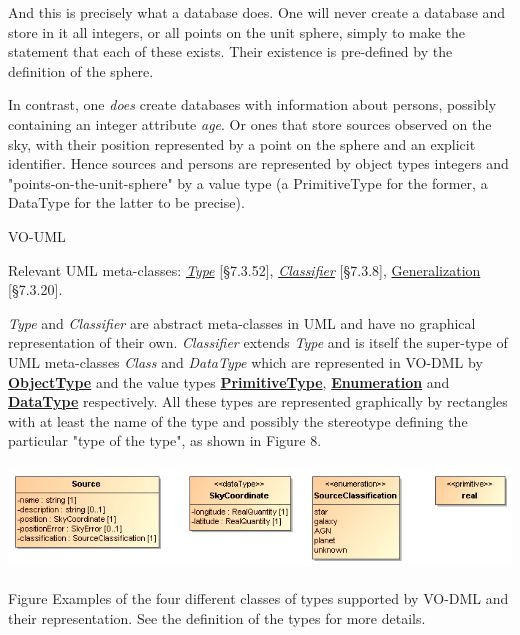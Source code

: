 \documentclass[10pt,a4paper]{ivoa}
\begin{document}
And this is precisely what a database does. One will never create a
database and store in it all integers, or all points on the unit sphere,
simply to make the statement that each of these exists. Their existence
is pre-defined by the definition of the sphere.

In contrast, one \emph{does} create databases with information about
persons, possibly containing an integer attribute \emph{age}. Or ones
that store sources observed on the sky, with their position represented
by a point on the sphere and an explicit identifier. Hence sources and
persons are represented by object types integers and
"points-on-the-unit-sphere" by a value type (a PrimitiveType for the
former, a DataType for the latter to be precise).

\protect\hypertarget{_extends:_ElementRef}{}{}

VO-UML

Relevant UML meta-classes:
\href{http://www.uml-diagrams.org/uml-core.html\#type}{\emph{Type}}
{[}§7.3.52{]},
\href{http://www.uml-diagrams.org/classifier.html}{\emph{Classifier}}
{[}§7.3.8{]},
\href{http://www.uml-diagrams.org/generalization.html}{Generalization}
{[}§7.3.20{]}.

\emph{Type} and \emph{Classifier} are abstract meta-classes in UML and
have no graphical representation of their own. \emph{Classifier} extends
\emph{Type} and is itself the super-type of UML meta-classes
\emph{Class} and \emph{DataType} which are represented in VO-DML by
\protect\hyperlink{objecttype-extends-type}{\textbf{ObjectType}} and the
value types
\protect\hyperlink{primitivetype-extends-valuetype}{\textbf{PrimitiveType}},
\protect\hyperlink{enumeration-extends-valuetype}{\textbf{Enumeration}}
and \protect\hyperlink{datatype-extends-valuetype}{\textbf{DataType}}
respectively. All these types are represented graphically by rectangles
with at least the name of the type and possibly the stereotype defining
the particular "type of the type", as shown in Figure 8.

\includegraphics[width=5.74167in,height=1.1in]{./media/image11.png}

Figure Examples of the four different classes of types supported by
VO-DML and their representation. See the definition of the types for
more details.
\end{document}
